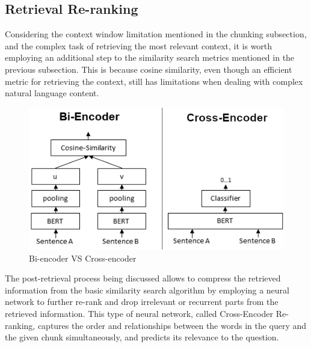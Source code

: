 \subsection{Retrieval Re-ranking}
Considering the context window limitation mentioned in the chunking subsection, and the complex task of retrieving the most relevant context, it is worth employing an additional step to the similarity search metrics mentioned in the previous subsection. This is because cosine similarity, even though an efficient metric for retrieving the context, still has limitations when dealing with complex natural language content.
\begin{figure}[H]
    \centering
    \includegraphics[width=.8\linewidth]{./figures/Bi_vs_Cross-Encoder.png}
    \caption{Bi-encoder VS Cross-encoder \cite{bivscrossencoders}}
\end{figure}
The post-retrieval process being discussed allows to compress the retrieved information from the basic similarity search algorithm by employing a neural network to further re-rank and drop irrelevant or recurrent parts from the retrieved information. This type of neural network, called Cross-Encoder Re-ranking, captures the order and relationships between the words in the query and the given chunk simultaneously, and predicts its relevance to the question.
